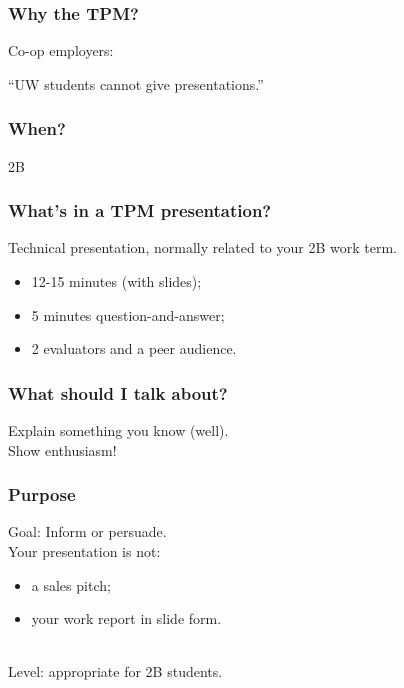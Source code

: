 \documentclass{beamer}
\begin{document}
\begin{frame}
\frametitle{Why the TPM?}

\Large
Co-op employers:

\begin{center}
``UW students cannot give presentations.''
\end{center}

\end{frame}

\begin{frame}

\frametitle{When?}

\begin{center}
{\Large 2B}
\end{center}

\end{frame}

\begin{frame}

\frametitle{What's in a TPM presentation?}

Technical presentation, normally related to your 2B work term.

\begin{itemize}
\item 12-15 minutes (with slides);
\item 5 minutes question-and-answer; 
\item 2 evaluators and a peer audience.
\end{itemize}

\end{frame}

\begin{frame}

\frametitle{What should I talk about?}

\Large
Explain something you know (well).\\[2em]

Show enthusiasm!

\end{frame}

\begin{frame}

\frametitle{Purpose}

\Large
Goal: Inform or persuade.\\[2em]

Your presentation is not:
\begin{itemize}
\item a sales pitch;
\item your work report in slide form.
\end{itemize}
~\\[1em]

Level: appropriate for 2B students.

\end{frame}
\end{document}
